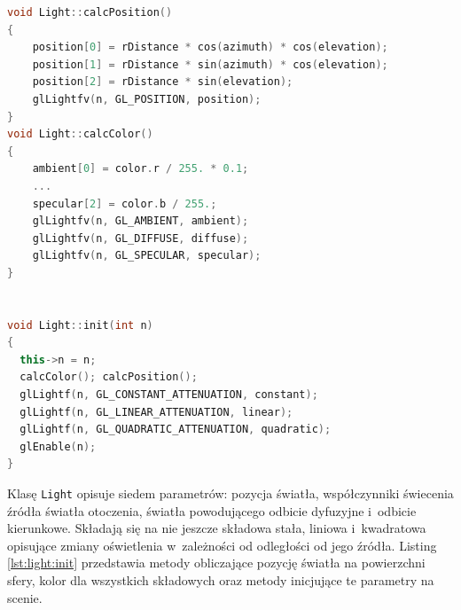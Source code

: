 \begin{lstlisting}[language=C++, caption=Metody inicjujące światło na scenie., label={lst:light:init}]
void Light::calcPosition()
{
    position[0] = rDistance * cos(azimuth) * cos(elevation);
    position[1] = rDistance * sin(azimuth) * cos(elevation);
    position[2] = rDistance * sin(elevation);
    glLightfv(n, GL_POSITION, position);
}
void Light::calcColor()
{
    ambient[0] = color.r / 255. * 0.1;
    ...
    specular[2] = color.b / 255.;
    glLightfv(n, GL_AMBIENT, ambient);
    glLightfv(n, GL_DIFFUSE, diffuse);
    glLightfv(n, GL_SPECULAR, specular);
}


void Light::init(int n)
{
  this->n = n;
  calcColor(); calcPosition();
  glLightf(n, GL_CONSTANT_ATTENUATION, constant);
  glLightf(n, GL_LINEAR_ATTENUATION, linear);
  glLightf(n, GL_QUADRATIC_ATTENUATION, quadratic);
  glEnable(n);
}
\end{lstlisting}


Klasę \lstinline{Light} opisuje siedem parametrów: pozycja światła, współczynniki świecenia źródła światła otoczenia, światła powodującego odbicie dyfuzyjne i~odbicie kierunkowe. Składają się na nie jeszcze składowa stała, liniowa i~kwadratowa opisujące zmiany oświetlenia w~zależności od odległości od jego źródła. Listing \ref{lst:light:init} przedstawia metody obliczające pozycję światła na powierzchni sfery, kolor dla wszystkich składowych oraz metody inicjujące te parametry na scenie.

